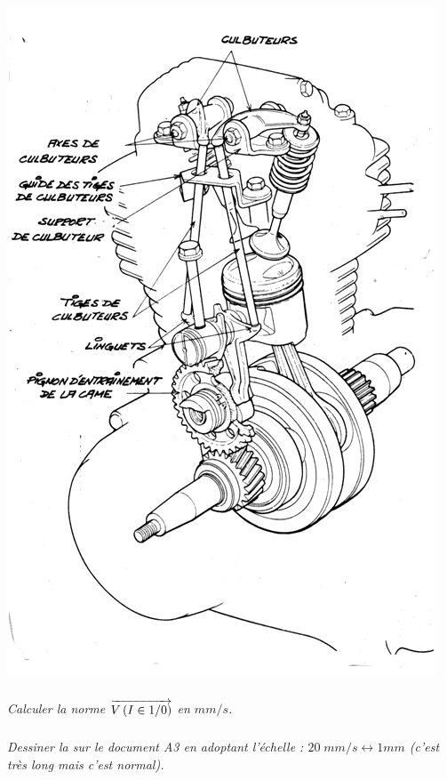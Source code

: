 \documentclass[10pt]{article}
\begin{document}
\begin{minipage}[c]{.48\linewidth}
\begin{center}
\includegraphics[width=.95\textwidth]{images/soupape_1}
\end{center}
\end{minipage}

\subparagraph{}
\textit{Calculer la norme $\overrightarrow{V\left( {I} \in {1}/{0}\right)}$ en $mm/s$.}

\subparagraph{}
\textit{Dessiner la sur le document A3 en adoptant l'échelle : $20\; mm/s \leftrightarrow 1 mm$ (c'est très long mais c'est normal).}
\end{document}
